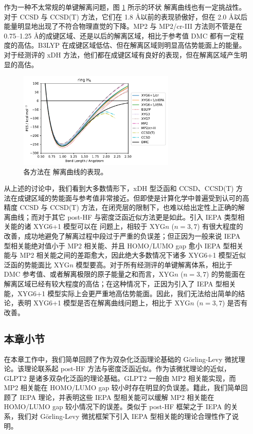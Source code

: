 作为一种不太常规的单键解离问题，图 \ref{fig.curve-H6} 所示的环状  解离曲线也有一定挑战性。对于 CCSD 与 CCSD(T) 方法，它们在 1.8 \AA 以前的表现骄傲好，但在 2.0 \AA 以后能量明显地出现了不符合物理直觉的下降。MP2 与 MP2/cr-III 方法则不管是在 0.75--1.25 \AA 的成键区域、还是以后的解离区域，相比于参考值 DMC 都有一定程度的高估。B3LYP 在成键区域低估、但在解离区域则明显高估势能面上的能量。对于经测评的 xDH 方法，他们都在成键区域有良好的表现，但在解离区域产生明显的高估。

\begin{figure}[h]
  \centering
  \caption{各方法在  解离曲线的表现。}
  \label{fig.curve-H6}
  \includegraphics[width=0.7\textwidth]{assets/curve-H6.pdf}
\end{figure}

从上述的讨论中，我们看到大多数情形下，xDH 型泛函和 CCSD、CCSD(T) 方法在成键区域的势能面与参考值非常接近。但即使是计算化学中普遍受到认可的高精度 CCSD 与 CCSD(T) 方法，在闭壳层的限制下，也难以给出定性上正确的解离曲线；而对于其它 post-HF 与密度泛函近似方法更是如此。引入 IEPA 类型相关能的诸 XYG6+1 模型可以在  问题上，相较于 XYG$n$ ($n=3,7$) 有很大程度的改善，成功地避免了解离过程中段过于严重的负误差；但正因为一般来说 IEPA 型相关能绝对值小于 MP2 相关能、并且 HOMO/LUMO gap 愈小 IEPA 型相关能与 MP2 相关能之间的差距愈大，因此绝大多数情况下诸多 XYG6+1 模型近似泛函的势能面比 XYG$n$ 模型要高。对于所有经测评的单键解离体系，相比于 DMC 参考值、或者解离极限的原子能量之和而言，XYG$n$ ($n=3,7$) 的势能面在解离区域已经有较大程度的高估；在这种情况下，正因为引入了 IEPA 型相关能，XYG6+1 模型实际上会更严重地高估势能面。因此，我们无法给出简单的结论，表明 XYG6+1 模型是否在解离曲线问题上，相比于 XYG$n$ ($n=3,7$) 是否有改善。

\subsection{本章小节}

在本章工作中，我们简单回顾了作为双杂化泛函理论基础的 G\"orling-Levy 微扰理论。该理论联系起 post-HF 方法与密度泛函近似。作为该微扰理论的近似，GLPT2 是诸多双杂化泛函的理论基础。GLPT2 一般由 MP2 相关能实现，而 MP2 相关能在 HOMO/LUMO gap 较小时存在明显的负误差。籍此，我们简单回顾了 IEPA 理论，并表明这些 IEPA 型相关能可以缓解 MP2 相关能在 HOMO/LUMO gap 较小情况下的误差。类似于 post-HF 框架之于 IEPA 的关系，我们对 G\"orling-Levy 微扰框架下引入 IEPA 型相关能的理论合理性作了说明。

